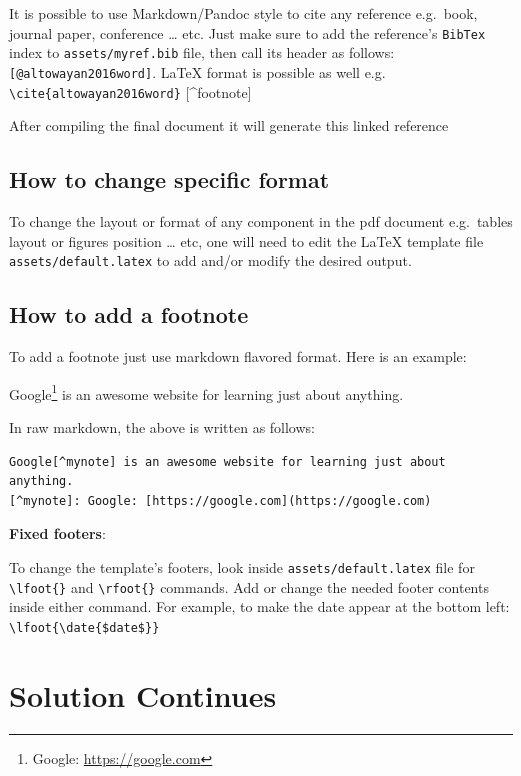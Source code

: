 \documentclass[]{article}
\begin{document}
It is possible to use Markdown/Pandoc style to cite any reference
e.g.~book, journal paper, conference \ldots{} etc. Just make sure to add
the reference's \texttt{BibTex} index to \texttt{assets/myref.bib} file,
then call its header as follows: \texttt{{[}@altowayan2016word{]}}.
LaTeX format is possible as well e.g.
\texttt{\textbackslash{}cite\{altowayan2016word\}} {[}\^{}footnote{]}

After compiling the final document it will generate this linked
reference \citep{altowayan2016word}

\subsection{How to change specific
format}\label{how-to-change-specific-format}

To change the layout or format of any component in the pdf document
e.g.~tables layout or figures position \ldots{} etc, one will need to
edit the LaTeX template file \texttt{assets/default.latex} to add and/or
modify the desired output.

\subsection{How to add a footnote}\label{how-to-add-a-footnote}

To add a footnote just use markdown flavored format. Here is an example:

Google\footnote{Google: \url{https://google.com}} is an awesome website
for learning just about anything.

In raw markdown, the above is written as follows:

\begin{verbatim}
Google[^mynote] is an awesome website for learning just about anything.
[^mynote]: Google: [https://google.com](https://google.com)
\end{verbatim}

\textbf{Fixed footers}:

To change the template's footers, look inside
\texttt{assets/default.latex} file for
\texttt{\textbackslash{}lfoot\{\}} and
\texttt{\textbackslash{}rfoot\{\}} commands. Add or change the needed
footer contents inside either command. For example, to make the date
appear at the bottom left:
\texttt{\textbackslash{}lfoot\{\textbackslash{}date\{\$date\$\}\}}

\section{Solution Continues}\label{solution-continues}
\end{document}
